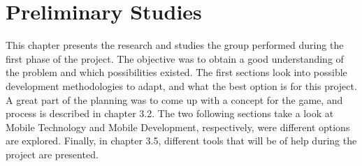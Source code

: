 \chapter{Preliminary Studies}

This chapter presents the research and studies the group performed during the first phase of 
the project. The objective was to obtain a good understanding of the problem and which 
possibilities existed. The first sections look into possible development methodologies to 
adapt, and what the best option is for this project. A great part of the planning was to 
come up with a concept for the game, and process is described in chapter 3.2. The two following 
sections take a look at Mobile Technology and Mobile Development, respectively, were different 
options are explored. Finally, in chapter 3.5, different tools that will be of help during the 
project are presented.